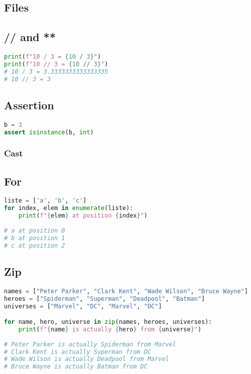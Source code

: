 \documentclass[a4paper, 12pt]{article}
\begin{document}
\subsection{Files}

\subsection{// and **}
\begin{lstlisting}[language=Python]
print(f"10 / 3 = {10 / 3}")
print(f"10 // 3 = {10 // 3}")
# 10 / 3 = 3.3333333333333335
# 10 // 3 = 3
\end{lstlisting}

\subsection{Assertion}
\label{subsec:Assertion}
\begin{lstlisting}[language=Python]
b = 3
assert isinstance(b, int)
\end{lstlisting}

\subsubsection{Cast}

\subsection{For}
\begin{lstlisting}[language=Python]
liste = ['a', 'b', 'c']
for index, elem in enumerate(liste):
	print(f"{elem} at position {index}")
	
# a at position 0
# b at position 1
# c at position 2
\end{lstlisting}

\subsection{Zip}
\begin{lstlisting}[language=Python]
names = ["Peter Parker", "Clark Kent", "Wade Wilson", "Bruce Wayne"]
heroes = ["Spiderman", "Superman", "Deadpool", "Batman"]
universes = ["Marvel", "DC", "Marvel", "DC"]

for name, hero, universe in zip(names, heroes, universes):
	print(f"{name} is actually {hero} from {universe}")
	
# Peter Parker is actually Spiderman from Marvel
# Clark Kent is actually Superman from DC
# Wade Wilson is actually Deadpool from Marvel
# Bruce Wayne is actually Batman from DC
\end{lstlisting}
\end{document}
